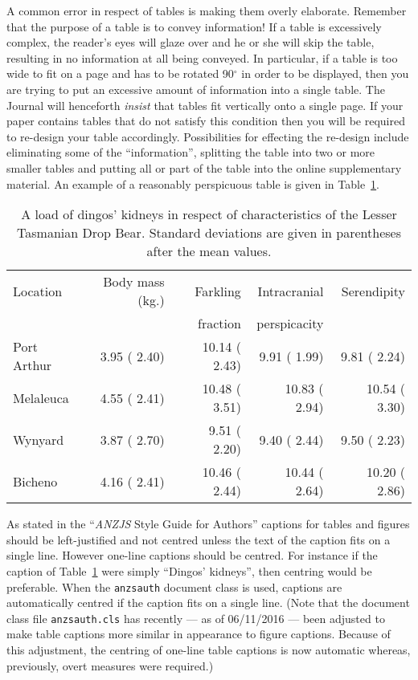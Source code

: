 \documentclass[times, doublespace]{anzsauth}
\begin{document}
A common error in respect of tables is making them overly elaborate.
Remember that the purpose of a table is to convey information! If
a table is excessively complex, the reader's eyes will glaze over
and he or she will skip the table, resulting in no information at
all being conveyed.  In particular, if a table is too wide to fit
on a page and has to be rotated 90$^\circ$ in order to be displayed,
then you are trying to put an excessive amount of information into
a single table.  The Journal will henceforth \emph{insist} that
tables fit vertically onto a single page.  If your paper contains
tables that do not satisfy this condition then you will be required
to re-design your table accordingly.  Possibilities for effecting the
re-design include eliminating some of the ``information'', splitting
the table into two or more smaller tables and putting all or part
of the table into the online supplementary material.  An example
of a reasonably perspicuous table is given in Table~\ref{tab:ltdb}.
\begin{table}[htp]
\caption{\label{tab:ltdb}
A load of dingos' kidneys in respect
of characteristics of the Lesser Tasmanian Drop Bear.  Standard
deviations are given in parentheses after the mean values.}
\centering
\begin{tabular}{|l|r|r|r|r|} \hline
Location & Body mass (kg.) & Farkling & Intracranial & Serendipity \\ 
         &                 & fraction & perspicacity &             \\ \hline
  Port Arthur &  3.95 ( 2.40) & 10.14 ( 2.43) &  9.91 ( 1.99) &  9.81 ( 2.24) \\ 
  Melaleuca   &  4.55 ( 2.41) & 10.48 ( 3.51) & 10.83 ( 2.94) & 10.54 ( 3.30) \\ 
  Wynyard     &  3.87 ( 2.70) &  9.51 ( 2.20) &  9.40 ( 2.44) &  9.50 ( 2.23) \\ 
  Bicheno     &  4.16 ( 2.41) & 10.46 ( 2.44) & 10.44 ( 2.64) & 10.20 ( 2.86) \\ 
   \hline
\end{tabular}
\end{table}
As stated in the ``\textit{ANZJS} Style Guide for Authors''
captions for tables and figures should be left-justified and not
centred unless the text of the caption fits on a single line.
However one-line captions should be centred.  For instance if the
caption of Table~\ref{tab:ltdb} were simply ``Dingos' kidneys'',
then centring would be preferable.  When the \texttt{anzsauth}
document class is used, captions are automatically centred if
the caption fits on a single line.  (Note that the document class
file \texttt{anzsauth.cls} has recently --- as of 06/11/2016 ---
been adjusted to make table captions more similar in appearance
to figure captions.  Because of this adjustment, the centring
of one-line table captions is now automatic whereas, previously,
overt measures were required.)
\end{document}
